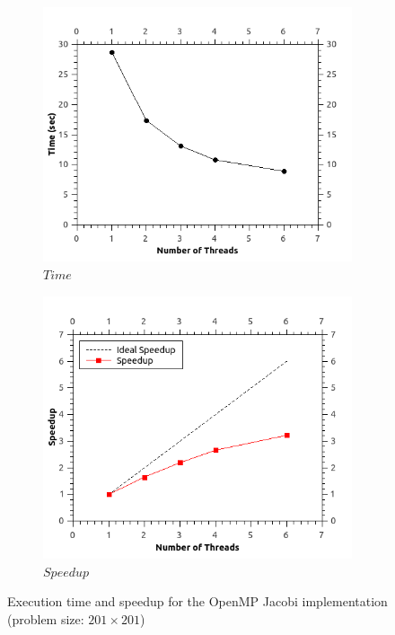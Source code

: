 \documentclass[11pt]{report}
\begin{document}
\begin{figure}[th!]
\centering
\begin{subfigure}{0.45\textwidth}
  \centering
  \includegraphics[width=1.0\linewidth]{images/jacobi_time_201}
  \caption{$Time$}
\end{subfigure}
\begin{subfigure}{0.45\textwidth}
  \centering
  \includegraphics[width=1.0\linewidth]{images/jacobi_speedup_201}
  \caption{$Speedup$}
\end{subfigure}
\caption{Execution time and speedup for the OpenMP Jacobi implementation (problem size: $201 \times 201$) }
\label{fig:example5.2}
\end{figure}
\end{document}
